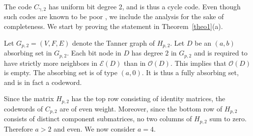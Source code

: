 The code $C_{\gamma,2}$ has uniform bit degree 2, and is thus a
cycle code. Even though such codes are known to be poor
\cite{peterson}, we include the analysis for the sake of
completeness.
We start by proving the statement in Theorem~\ref{theo1}(a).

Let $G_{p,2}=(V,F,E)$ denote the Tanner graph of $H_{p,2}$. Let
$D$ be an $(a,b)$ absorbing set in $G_{p,2}$. Each bit node in $D$
has degree $2$ in $G_{p,2}$ and is required to have strictly more
neighbors in $\mathcal{E}(D)$ than in $\mathcal{O}(D)$. This
implies that $\mathcal{O}(D)$ is empty. The absorbing set is of
type $(a,0)$. It is thus a fully absorbing set, and is in fact a
codeword.

Since the matrix $H_{p,2}$ has the top row consisting of identity
matrices, the codewords of $C_{p,2}$ are of even weight. Moreover,
since the bottom row of $H_{p,2}$ consists of distinct component
submatrices, no two columns of $H_{p,2}$ sum to zero. Therefore
$a>2$ and even. We now consider $a = 4$.

